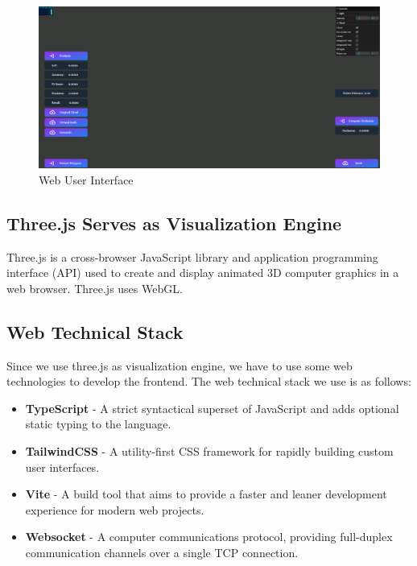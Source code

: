 \documentclass[11pt, a4paper,oneside,chapterprefix=false]{scrbook}
\begin{document}
\noindent
\begin{minipage}{\textwidth}
	\begin{figure}[H]
		\includegraphics*[width=1.0\textwidth]{figures/ui.png}
		\caption{Web User Interface }
		\label{fig:web user interface}
	\end{figure}
\end{minipage}

\subsection{Three.js Serves as Visualization Engine}

Three.js is a cross-browser JavaScript library and application programming interface (API) used to create and display animated 3D computer graphics in a web browser. Three.js uses WebGL.

\subsection{Web Technical Stack}

Since we use three.js as visualization engine, we have to use some web technologies to develop the frontend. The web technical stack we use is as follows: 

\begin{itemize}
	\item \textbf{TypeScript} - A strict syntactical superset of JavaScript and adds optional static typing to the language.
	\item \textbf{TailwindCSS} - A utility-first CSS framework for rapidly building custom user interfaces.
	\item \textbf{Vite} - A build tool that aims to provide a faster and leaner development experience for modern web projects.
	\item \textbf{Websocket} - A computer communications protocol, providing full-duplex communication channels over a single TCP connection.
\end{itemize}
\end{document}
